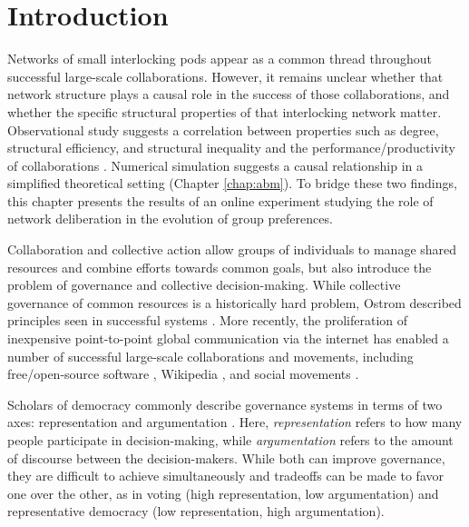 \section{Introduction}
Networks of small interlocking pods appear as a common thread throughout
successful large-scale collaborations.
However, it remains unclear whether that network structure plays a causal role
in the success of those collaborations,
and whether the specific structural properties of that interlocking network matter.
Observational study suggests a correlation between properties such as degree,
structural efficiency, and structural inequality and the performance/productivity
of collaborations \cite{platt_network_2018}.
Numerical simulation suggests a causal relationship in a simplified theoretical
setting (Chapter \ref{chap:abm}).
To bridge these two findings,
this chapter presents the results of an online experiment studying the role of network deliberation in the evolution of group preferences.

Collaboration and collective action allow groups of individuals to manage shared resources and combine efforts towards common goals, but also introduce the problem of governance and collective decision-making.
While collective governance of common resources is a historically hard problem, Ostrom described principles seen in successful systems \cite{ostrom_collective_2000}.
More recently, the proliferation of inexpensive point-to-point global communication via the internet has enabled a number of successful large-scale collaborations and movements, including free/open-source software \cite{benkler_coases_2002, coleman_coding_2012, raymond_cathedral_1999}, Wikipedia \cite{keegan_evolution_2017, benkler_coases_2002, giles_internet_2005}, and social movements \cite{tufekci_twitter_2017, gonzalez-bailon_networked_2016}.

Scholars of democracy commonly describe governance systems in terms of two axes: representation and argumentation \cite{ackerman_deliberation_2002, gonzalez-bailon_networked_2016}. Here, {\em representation} refers to how many people participate in decision-making, while {\em argumentation} refers to the amount of discourse between the decision-makers.
While both can improve governance, they are difficult to achieve simultaneously \cite{gentry_consensus_1982, freeman_tyranny_1972} and tradeoffs can be made to favor one over the other, as in voting (high representation, low argumentation) and representative democracy (low representation, high argumentation).

